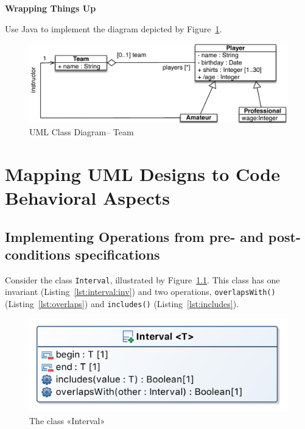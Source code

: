 \documentclass[a4paper,11pt]{memoir}
\newcommand{\code}[1]{\lstinline{#1}}
\begin{document}
\begin{solution}
		\lstset{language=Java}
		
			
\end{solution}

\begin{question}
	\textbf{Wrapping Things Up}
	
	Use Java to implement the diagram depicted by Figure~\ref{fig:team}.

	\begin{figure}[htbp]
		\centering
			\includegraphics[width=.8\linewidth]{Team}
		\caption{UML Class Diagram\--- Team}
		\label{fig:team}
	\end{figure}
	
\end{question}

\chapter{Mapping UML Designs to Code \\ Behavioral Aspects}

\section{Implementing Operations from pre- and post-conditions specifications}

	Consider the class \code{Interval}, illustrated by Figure~\ref{fig:interval}.
	This class has one invariant (Listing~\ref{lst:interval:inv}) and two operations,
	\code{overlapsWith()} (Listing~\ref{lst:overlaps}) and \code{includes()} (Listing~\ref{lst:includes}).

\begin{figure}[htbp]
	\centering
		\includegraphics[width=.4\linewidth]{Interval.png}
	\caption{The class «Interval»}
	\label{fig:interval}
\end{figure}
\end{document}
